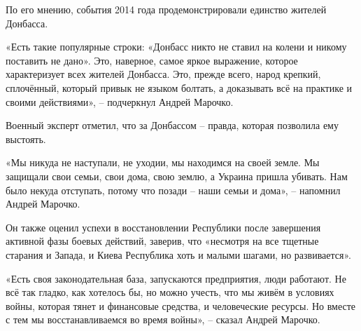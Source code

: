 По его мнению, события 2014 года продемонстрировали единство жителей Донбасса.

«Есть такие популярные строки: «Донбасс никто не ставил на колени и никому
поставить не дано». Это, наверное, самое яркое выражение, которое характеризует
всех жителей Донбасса. Это, прежде всего, народ крепкий, сплочённый, который
привык не языком болтать, а доказывать всё на практике и своими действиями», –
подчеркнул Андрей Марочко.

Военный эксперт отметил, что за Донбассом – правда, которая позволила ему
выстоять.

«Мы никуда не наступали, не уходии, мы находимся на своей земле. Мы защищали
свои семьи, свои дома, свою землю, а Украина пришла убивать. Нам было некуда
отступать, потому что позади – наши семьи и дома», – напомнил Андрей Марочко.

Он также оценил успехи в восстановлении Республики после завершения активной
фазы боевых действий, заверив, что «несмотря на все тщетные старания и Запада,
и Киева Республика хоть и малыми шагами, но развивается».

«Есть своя законодательная база, запускаются предприятия, люди работают. Не всё
так гладко, как хотелось бы, но можно учесть, что мы живём в условиях войны,
которая тянет и финансовые средства, и человеческие ресурсы. Но вместе с тем мы
восстанавливаемся во время войны», – сказал Андрей Марочко.

